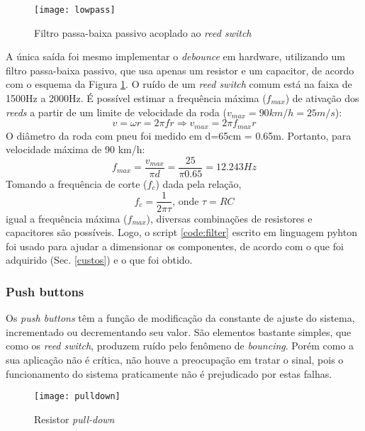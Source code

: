 \documentclass[a4paper,11pt]{article}
\begin{document}
\begin{figure}[ht]
 \begin{center}
  \texttt{[image: lowpass]}
 \end{center}
 \caption{Filtro passa-baixa passivo acoplado ao \textit{reed switch}}
 \label{fig:lowpass}
\end{figure}

A única saída foi mesmo implementar o \textit{debounce} em hardware, utilizando
um filtro passa-baixa passivo, que usa apenas um resistor e um capacitor, de
acordo com o esquema da Figura \ref{fig:lowpass}. O ruído de um \textit{reed
switch} comum está na faixa de 1500Hz a 2000Hz\cite{reed}. É possível estimar a
frequência máxima ($f_{max}$) de ativação dos \textit{reeds} a partir de um
limite de velocidade da roda ($v_{max} = 90 km/h = 25 m/s$):
\begin{equation}
  v = \omega r = 2\pi f r \Rightarrow v_{max} = 2\pi f_{max} r
\end{equation}
O diâmetro da roda com pneu foi medido em d=65cm = 0.65m. Portanto, para
velocidade máxima de 90 km/h:
\begin{equation}
  f_{max} = \frac{\displaystyle v_{max}}{\displaystyle \pi d} =
\frac{\displaystyle 25}{\displaystyle \pi 0.65} = 12.243 Hz
\end{equation}
Tomando a frequência de corte ($f_{c}$) dada pela relação,
\begin{equation}
  f_{c} = \frac{\displaystyle 1}{\displaystyle 2\pi\tau} \text{, onde } \tau =
RC
\end{equation}
igual a frequência máxima ($f_{max}$), diversas combinações de resistores e
capacitores são possíveis. Logo, o script \ref{code:filter} escrito em
linguagem pyhton\cite{python} foi usado para ajudar a dimensionar os
componentes, de acordo com o que foi adquirido (Sec. \ref{custos}) e o que foi
obtido.

\subsubsection{Push buttons}
\label{sec:buttons}
Os \textit{push buttons} têm a função de modificação da constante de ajuste do
sistema, incrementado ou decrementando seu valor. São elementos bastante
simples, que como os \textit{reed switch}, produzem ruído pelo fenômeno de
\textit{bouncing}. Porém como a sua aplicação não é crítica, não houve a
preocupação em tratar o sinal, pois o funcionamento do sistema praticamente não
é prejudicado por estas falhas.
\begin{figure}[ht]
\begin{center}
 \texttt{[image: pulldown]}
\end{center}
  \caption{Resistor \textit{pull-down}}
  \label{fig:pulldown}
\end{figure}
\end{document}
